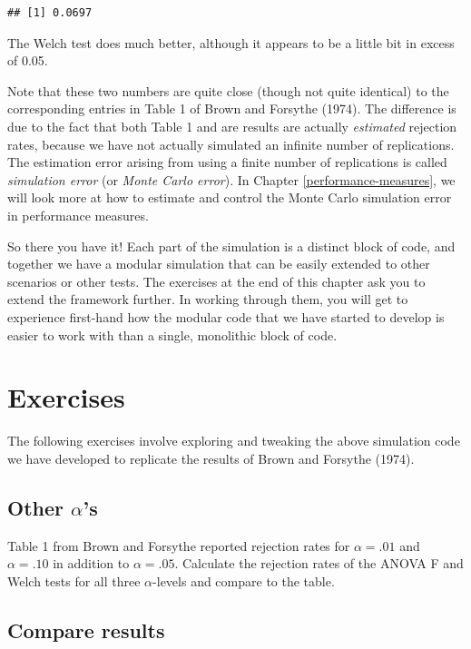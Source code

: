 \documentclass[
]{book}
\begin{document}
\begin{verbatim}
## [1] 0.0697
\end{verbatim}

The Welch test does much better, although it appears to be a little bit in excess of 0.05.

Note that these two numbers are quite close (though not quite identical) to the corresponding entries in Table 1 of Brown and Forsythe (1974). The difference is due to the fact that both Table 1 and are results are actually \emph{estimated} rejection rates, because we have not actually simulated an infinite number of replications. The estimation error arising from using a finite number of replications is called \emph{simulation error} (or \emph{Monte Carlo error}).
In Chapter \ref{performance-measures}, we will look more at how to estimate and control the Monte Carlo simulation error in performance measures.

So there you have it! Each part of the simulation is a distinct block of code, and together we have a modular simulation that can be easily extended to other scenarios or other tests.
The exercises at the end of this chapter ask you to extend the framework further.
In working through them, you will get to experience first-hand how the modular code that we have started to develop is easier to work with than a single, monolithic block of code.

\section{Exercises}\label{exAnovaExercises}

The following exercises involve exploring and tweaking the above simulation code we have developed to replicate the results of Brown and Forsythe (1974).

\subsection{\texorpdfstring{Other \(\alpha\)'s}{Other \textbackslash alpha's}}\label{BF-other-alphas}

Table 1 from Brown and Forsythe reported rejection rates for \(\alpha = .01\) and \(\alpha = .10\) in addition to \(\alpha = .05\). Calculate the rejection rates of the ANOVA F and Welch tests for all three \(\alpha\)-levels and compare to the table.

\subsection{Compare results}\label{BF-compare-results}
\end{document}
